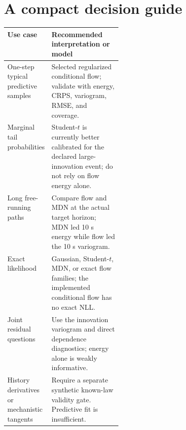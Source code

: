 \documentclass[11pt]{article}
\begin{document}
\section{A compact decision guide}

\begin{tabularx}{\linewidth}{p{0.27\linewidth}X}
\toprule
Use case & Recommended interpretation or model \\
\midrule
One-step typical predictive samples & Selected regularized conditional flow; validate with energy, CRPS, variogram, RMSE, and coverage. \\
Marginal tail probabilities & Student-$t$ is currently better calibrated for the declared large-innovation event; do not rely on flow energy alone. \\
Long free-running paths & Compare flow and MDN at the actual target horizon; MDN led 10 s energy while flow led the 10 s variogram. \\
Exact likelihood & Gaussian, Student-$t$, MDN, or exact flow families; the implemented conditional flow has no exact NLL. \\
Joint residual questions & Use the innovation variogram and direct dependence diagnostics; energy alone is weakly informative. \\
History derivatives or mechanistic tangents & Require a separate synthetic known-law validity gate. Predictive fit is insufficient. \\
\bottomrule
\end{tabularx}

\clearpage


\end{document}

